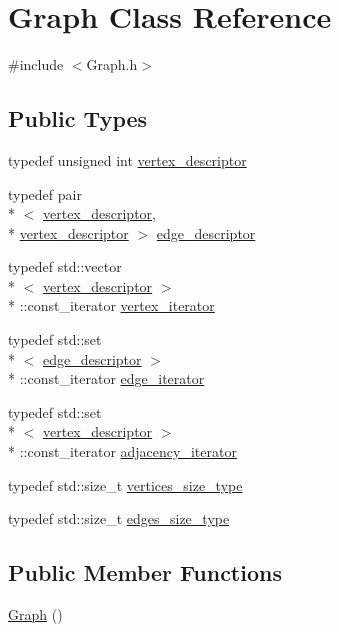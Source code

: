 \hypertarget{classGraph}{\section{Graph Class Reference}
\label{classGraph}
}


{\ttfamily \#include $<$Graph.\-h$>$}

\subsection*{Public Types}
\begin{DoxyCompactItemize}
\item 
typedef unsigned int \hyperlink{classGraph_a9b97d75f995b7c1cb0b5760690bef3ba}{vertex\-\_\-descriptor}
\item 
typedef pair\\*
$<$ \hyperlink{classGraph_a9b97d75f995b7c1cb0b5760690bef3ba}{vertex\-\_\-descriptor}, \\*
\hyperlink{classGraph_a9b97d75f995b7c1cb0b5760690bef3ba}{vertex\-\_\-descriptor} $>$ \hyperlink{classGraph_ab641b227e6d3e56c3340cda156fc2bad}{edge\-\_\-descriptor}
\item 
typedef std\-::vector\\*
$<$ \hyperlink{classGraph_a9b97d75f995b7c1cb0b5760690bef3ba}{vertex\-\_\-descriptor} $>$\\*
\-::const\-\_\-iterator \hyperlink{classGraph_aee10ac35c0bad19ebc93f33eb08e149d}{vertex\-\_\-iterator}
\item 
typedef std\-::set\\*
$<$ \hyperlink{classGraph_ab641b227e6d3e56c3340cda156fc2bad}{edge\-\_\-descriptor} $>$\\*
\-::const\-\_\-iterator \hyperlink{classGraph_a1082e7f0c0beefee6a7950e951a081f6}{edge\-\_\-iterator}
\item 
typedef std\-::set\\*
$<$ \hyperlink{classGraph_a9b97d75f995b7c1cb0b5760690bef3ba}{vertex\-\_\-descriptor} $>$\\*
\-::const\-\_\-iterator \hyperlink{classGraph_ad03c07358f7be9768eba3825f75ded45}{adjacency\-\_\-iterator}
\item 
typedef std\-::size\-\_\-t \hyperlink{classGraph_ac1e19ecbf236d08dff611584e4c9403e}{vertices\-\_\-size\-\_\-type}
\item 
typedef std\-::size\-\_\-t \hyperlink{classGraph_a1924745b438f862ba9aa7cd0ff5b7da5}{edges\-\_\-size\-\_\-type}
\end{DoxyCompactItemize}
\subsection*{Public Member Functions}
\begin{DoxyCompactItemize}
\item 
\hyperlink{classGraph_ae4c72b8ac4d693c49800a4c7e273654f}{Graph} ()
\end{DoxyCompactItemize}
